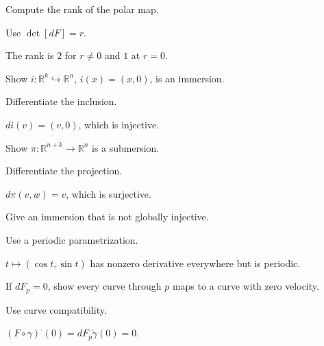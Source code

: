 \begin{exercise}\label{exr:vii04-18}
Compute the rank of the polar map.
\end{exercise}
\begin{hint}
Use \(\det[dF]=r\).
\end{hint}
\begin{solution}
The rank is \(2\) for \(r\ne0\) and \(1\) at \(r=0\).
\end{solution}

\begin{exercise}\label{exr:vii04-19}
Show \(i:\mathbb R^k\hookrightarrow\mathbb R^n\), \(i(x)=(x,0)\), is an immersion.
\end{exercise}
\begin{hint}
Differentiate the inclusion.
\end{hint}
\begin{solution}
\(di(v)=(v,0)\), which is injective.
\end{solution}

\begin{exercise}\label{exr:vii04-20}
Show \(\pi:\mathbb R^{n+k}\to\mathbb R^n\) is a submersion.
\end{exercise}
\begin{hint}
Differentiate the projection.
\end{hint}
\begin{solution}
\(d\pi(v,w)=v\), which is surjective.
\end{solution}

\begin{exercise}\label{exr:vii04-21}
Give an immersion that is not globally injective.
\end{exercise}
\begin{hint}
Use a periodic parametrization.
\end{hint}
\begin{solution}
\(t\mapsto(\cos t,\sin t)\) has nonzero derivative everywhere but is periodic.
\end{solution}

\begin{exercise}\label{exr:vii04-22}
If \(dF_p=0\), show every curve through \(p\) maps to a curve with zero velocity.
\end{exercise}
\begin{hint}
Use curve compatibility.
\end{hint}
\begin{solution}
\((F\circ\gamma)^{\boldsymbol\cdot}(0)=dF_p\dot\gamma(0)=0\).
\end{solution}

